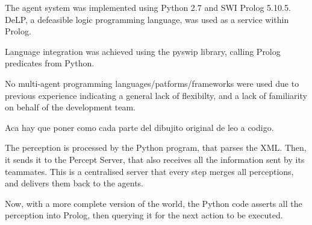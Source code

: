 \documentclass{llncs2e/llncs}
\begin{document}
\begin{comment}
PREGUNTAS {
1. Which programming language did you use to implement the multi-agent system?
2. Did you use multi-agent programming languages? Why or why not to use a 
multi-agent programming language?
3. How have you mapped the designed architecture (both multi-agent and 
individual agent architectures) to programming codes i.e., how did you 
implement specific agent-oriented concepts and designed artifacts using the 
programming language?
4. Which development platforms and tools are used? How much time did you 
invest in learning those?
5. Which runtime platforms and tools (e.g. Jade, AgentScape, simply Java, 
....) are used? How much time did you invest in learning those?
6. What features were missing in your language choice that would have 
facilitated your development task?
7. What features of your programming language has simplified your development 
task?
8. Which algorithms are used/implemented?
9. How did you distribute the agents on several machines? And if you did not 
please justify why.
10. To which extend is the reasoning of your agents synchronized with the 
receive-percepts/send-action cycle?
11. What part of the development was most difficult/complex? What kind of 
problems have you found and how are they solved?
12. How many lines of code did you write for your software?
}
\end{comment}

    The agent system was implemented using Python 2.7 and SWI Prolog 5.10.5. DeLP, 
    a defeasible logic programming language, was used as a service within Prolog.

    Language integration was achieved using the pyswip library, calling Prolog 
    predicates from Python.

    No multi-agent programming languages/patforms/frameworks were used due to 
    previous experience indicating a general lack of flexibilty, and a lack of 
    familiarity on behalf of the development team.

    Aca hay que poner como cada parte del dibujito original de leo a codigo.

    The perception is processed by the Python program, that parses the XML. Then, 
    it sends it to the Percept Server, that also receives all the information sent 
    by its teammates. This is a centralised server that every step merges all 
    perceptions, and delivers them back to the agents.

    Now, with a more complete version of the world, the Python code asserts all 
    the perception into Prolog, then querying it for the next action to be 
    executed. 
\end{document}
